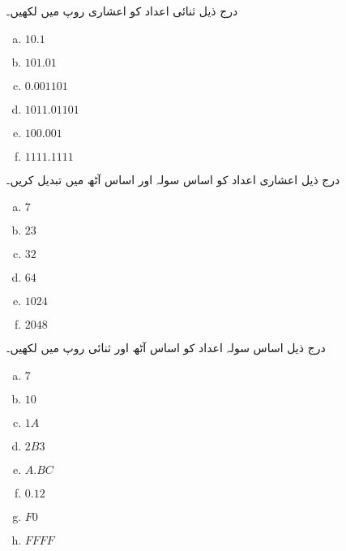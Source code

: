 درج ذیل ثنائی اعداد کو اعشاری روپ میں لکھیں۔
\begin{multicols}{4}
\begin{enumerate}[a.]

\item  
 
 \(10.1\)  
\item  
 
 \(101.01\)

\item  
 
 \(0.001101\) 
\item  
 
 \(1011.01101\)

\item  
 
 \(100.001\) 
\item  
 
 \(1111.1111\)
\end{enumerate}
\end{multicols}
درج ذیل اعشاری اعداد کو اساس سولہ اور اساس آٹھ میں تبدیل کریں۔
\begin{multicols}{4}
\begin{enumerate}[a.]

\item 
 \(7\) 
\item 
 \(23\) 
\item 
 \(32\) 
\item 
 \(64\)  

\item 
 \(1024\) 
\item 
 \(2048\)
\end{enumerate}
\end{multicols}
درج ذیل اساس سولہ اعداد کو اساس آٹھ اور ثنائی روپ میں لکھیں۔
\begin{multicols}{4}
\begin{enumerate}[a.]

\item 
 \(7\) 
\item 
 \(10\) 
\item 
 \(1A\) 
\item 
 \(2B3\) 

\item 
 \(A.BC\) 
\item 
 \(0.12\) 
\item 
 \(F0\) 
\item 
 \(FFFF\)
\end{enumerate}
\end{multicols} 
